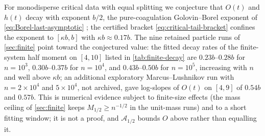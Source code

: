 \begin{remark}
\label{rem:exponent-conjecture}
For monodisperse critical data with equal splitting we conjecture that
$O(t)$ and $h(t)$ decay with exponent $b/2$, the pure-coagulation
Golovin--Borel exponent of \eqref{eq:Borel-last-asymptotic}
\citep{Golovin1963,Bertoin2009}; the certified bracket
\eqref{eq:critical-tail-bracket} confines the exponent to
$[\kappa b,b]$ with $\kappa b\approx0.17b$. The nine retained particle
runs of \cref{sec:finite} point toward the conjectured value: the
fitted decay rates of the finite-system half moment on $[4,10]$ listed
in \cref{tab:finite-decay} are $0.23b$--$0.28b$ for $n=10^3$,
$0.30b$--$0.37b$ for $n=10^4$, and $0.43b$--$0.50b$ for $n=10^5$,
increasing with $n$ and well above $\kappa b$; an additional exploratory Marcus--Lushnikov run with
$n=2\times10^4$ and $5\times10^4$, not archived, gave log-slopes of
$O(t)$ on $[4,9]$ of $0.54b$ and $0.57b$. This is numerical evidence
subject to finite-size effects (the mass ceiling of \cref{sec:finite}
keeps $M_{1/2}\geq n^{-1/2}$ in the unit-mass runs) and to a short
fitting window; it is not a proof, and $\mathcal A_{1/2}$ bounds $O$
above rather than equalling it.
\end{remark}


